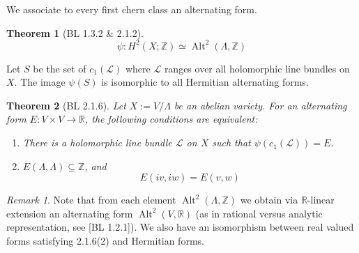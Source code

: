 \documentclass[12pt,reqno]{amsart}
\DeclareMathOperator{\Alt}{Alt}
\newcommand{\Z}{\mathbb{Z}}
\newcommand{\R}{\mathbb{R}}
\newcommand{\mc}{\mathcal}
\newtheorem*{thm*}{Theorem}
\theoremstyle{definition}
\theoremstyle{remark}
\newtheorem*{remark}{Remark}
\newcommand{\ti}{\todo[inline]}
\begin{document}

We associate to every first chern class an alternating form.

\begin{thm*} [BL 1.3.2 \& 2.1.2] $$\psi: H^2(X; \Z) \simeq \Alt^2(\Lambda, \Z)$$ 
\end{thm*} 




 
 
Let $S$ be the set of $c_1(\mc{L})$ where $\mc{L}$ ranges over all holomorphic line bundles on $X$. The image $\psi(S)$ is isomorphic to all Hermitian alternating forms.




\begin{thm*} [BL 2.1.6] Let $X:= V/\Lambda$ be an abelian variety. For an alternating form $E: V \times V \to \R$, the following conditions are equivalent: 

\begin{enumerate} 
\item There is a holomorphic line bundle $\mc{L}$ on $X$ such that $\psi(c_1(\mc{L}))= E$. 
\item $E(\Lambda, \Lambda) \subseteq \Z$, and $$E(iv, iw) = E(v, w)$$
\end{enumerate}
\end{thm*} 

 
\begin{remark} Note that from each element $\Alt^2(\Lambda, \Z)$ we obtain via $\R$-linear extension an alternating form $\Alt^2(V, \R)$ (as in rational versus analytic representation, see [BL 1.2.1]). We also have an isomorphism between real valued forms satisfying 2.1.6(2) and Hermitian forms. \end{remark}
\end{document}
